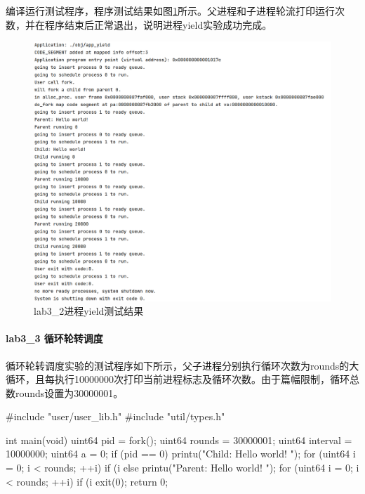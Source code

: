 编译运行测试程序，程序测试结果如图\ref{fig:lab3-2-testres}所示。父进程和子进程轮流打印运行次数，并在程序结束后正常退出，说明进程yield实验成功完成。
\begin{figure}[!htbp]
    \centering
    \includegraphics[width = 12cm]{figure/lab3_2_testresult.png}
    \caption{lab3_2进程yield测试结果}
    \label{fig:lab3-2-testres}
\end{figure}
\paragraph{lab3_3  循环轮转调度}
循环轮转调度实验的测试程序如下所示，父子进程分别执行循环次数为rounds的大循环，且每执行10000000次打印当前进程标志及循环次数。由于篇幅限制，循环总数rounds设置为30000001。

\begin{cppcode}
#include "user/user_lib.h"
#include "util/types.h"

int main(void) {
  uint64 pid = fork();
  uint64 rounds = 30000001;
  uint64 interval = 10000000;
  uint64 a = 0;
  if (pid == 0) {
    printu("Child: Hello world! \n");
    for (uint64 i = 0; i < rounds; ++i) {
      if (i %
    }
  } else {
    printu("Parent: Hello world! \n");
    for (uint64 i = 0; i < rounds; ++i) {
      if (i %
    }
  }
  exit(0);
  return 0;
}
\end{cppcode}

